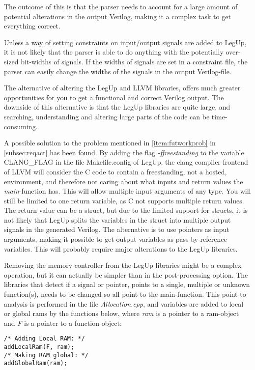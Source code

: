 The outcome of this is that the parser needs to account for a large amount of potential alterations in the output Verilog, making it a complex task to get everything correct.

Unless a way of setting constraints on input/output signals are added to LegUp, it is not likely that the parser is able to do anything with the potentially over-sized bit-widths of signals. If the widths of signals are set in a constraint file, the parser can easily change the widths of the signals in the output Verilog-file.

The alternative of altering the LegUp and LLVM libraries, offers much greater opportunities for you to get a functional and correct Verilog output. The downside of this alternative is that the LegUp libraries are quite large, and searching, understanding and altering large parts of the code can be time-consuming. 

A possible solution to the problem mentioned in \cref{item:futworkprob} in \cref{subsec:reqact} has been found. By adding the flag \textit{-ffreestanding} to the variable CLANG\_FLAG in the file Makefile.config of LegUp, the clang compiler frontend of LLVM will consider the C code to contain a freestanding, not a hosted, environment, and therefore not caring about what inputs and return values the \textit{main}-function has. This will allow multiple input arguments of any type. You will still be limited to one return variable, as C not supports multiple return values. The return value can be a struct, but due to the limited support for structs, it is not likely that LegUp splits the variables in the struct into multiple output signals in the generated Verilog. The alternative is to use pointers as input arguments, making it possible to get output variables as pass-by-reference variables. This will probably require major alterations to the LegUp libraries.   

Removing the memory controller from the LegUp libraries might be a complex operation, but it can actually be simpler than in the post-processing option. The libraries that detect if a signal or pointer, points to a single, multiple or unknown function(s), needs to be changed so all point to the main-function. This point-to analysis is performed in the file \textit{Allocation.cpp}, and variables are added to local or global \gls{ram}s by the functions below, where \textit{ram} is a pointer to a \gls{ram}-object and \textit{F} is a pointer to a function-object:
\lstset{language=C,style=Cstyle}
\begin{lstlisting}
/* Adding Local RAM: */
addLocalRam(F, ram);
/* Making RAM global: */
addGlobalRam(ram);
\end{lstlisting}

